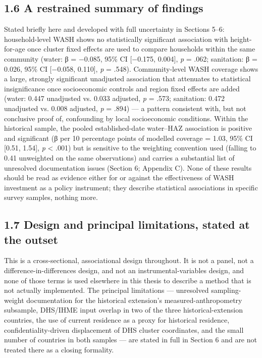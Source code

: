 \subsection*{1.6 A restrained summary of findings}

Stated briefly here and developed with full uncertainty in Sections 5--6: household-level WASH shows no statistically significant association with height-for-age once cluster fixed effects are used to compare households within the same community (water: β = −0.085, 95\% CI [−0.175, 0.004], \textit{p} = .062; sanitation: β = 0.026, 95\% CI [−0.058, 0.110], \textit{p} = .548). Community-level WASH coverage shows a large, strongly significant unadjusted association that attenuates to statistical insignificance once socioeconomic controls and region fixed effects are added (water: 0.447 unadjusted vs. 0.033 adjusted, \textit{p} = .573; sanitation: 0.472 unadjusted vs. 0.008 adjusted, \textit{p} = .894) --- a pattern consistent with, but not conclusive proof of, confounding by local socioeconomic conditions. Within the historical sample, the pooled established-date water--HAZ association is positive and significant (β per 10 percentage points of modelled coverage = 1.03, 95\% CI [0.51, 1.54], \textit{p} < .001) but is sensitive to the weighting convention used (falling to 0.41 unweighted on the same observations) and carries a substantial list of unresolved documentation issues (Section 6; Appendix C). None of these results should be read as evidence either for or against the effectiveness of WASH investment as a policy instrument; they describe statistical associations in specific survey samples, nothing more.

\subsection*{1.7 Design and principal limitations, stated at the outset}

This is a cross-sectional, associational design throughout. It is not a panel, not a difference-in-differences design, and not an instrumental-variables design, and none of those terms is used elsewhere in this thesis to describe a method that is not actually implemented. The principal limitations --- unresolved sampling-weight documentation for the historical extension's measured-anthropometry subsample, DHS/IHME input overlap in two of the three historical-extension countries, the use of current residence as a proxy for historical residence, confidentiality-driven displacement of DHS cluster coordinates, and the small number of countries in both samples --- are stated in full in Section 6 and are not treated there as a closing formality.

